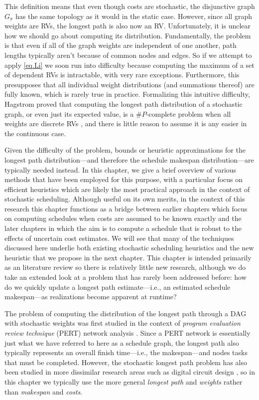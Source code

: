 \documentclass[12pt]{article}
\begin{document}
This definition means that even though costs are stochastic, the disjunctive graph $G_\pi$ has the same topology as it would in the static case. However, since all graph weights are RVs, the longest path is also now an RV. Unfortunately, it is unclear how we should go about computing its distribution. Fundamentally, the problem is that even if all of the graph weights are independent of one another, path lengths typically aren't because of common nodes and edges. So if we attempt to apply \eqref{eq.Li} we soon run into difficulty because computing the maximum of a set of dependent RVs is intractable, with very rare exceptions. Furthermore, this presupposes that all individual weight distributions (and summations thereof) are fully known, which is rarely true in practice. Formalizing this intuitive difficulty, Hagstrom proved that computing the longest path distribution of a stochastic graph, or even just its expected value, is a $\#P$-complete problem when all weights are discrete RVs \cite{hag88}, and there is little reason to assume it is any easier in the continuous case.      

Given the difficulty of the problem, bounds or heuristic approximations for the longest path distribution---and therefore the schedule makespan distribution---are typically needed instead. In this chapter, we give a brief overview of various methods that have been employed for this purpose, with a particular focus on efficient heuristics which are likely the most practical approach in the context of stochastic scheduling. Although useful on its own merits, in the context of this research this chapter functions as a bridge between earlier chapters which focus on computing schedules when costs are assumed to be known exactly and the later chapters in which the aim is to compute a schedule that is robust to the effects of uncertain cost estimates. We will see that many of the techniques discussed here underlie both existing stochastic scheduling heuristics and the new heuristic that we propose in the next chapter. This chapter is intended primarily as an literature review so there is relatively little new research, although we do take an extended look at a problem that has rarely been addressed before: how do we quickly update a longest path estimate---i.e., an estimated schedule makespan---as realizations become apparent at runtime? 

The problem of computing the distribution of the longest path through a DAG with stochastic weights was first studied in the context of {\em program evaluation review technique} (PERT) network analysis \cite{mal59}. Since a PERT network is essentially just what we have referred to here as a schedule graph, the longest path also typically represents an overall finish time---i.e., the makespan---and nodes tasks that must be completed. However, the stochastic longest path problem has also been studied in more dissimilar research areas such as digital circuit design \cite{bla08}, so in this chapter we typically use the more general {\em longest path} and {\em weights} rather than {\em makespan} and {\em costs}.
\end{document}
